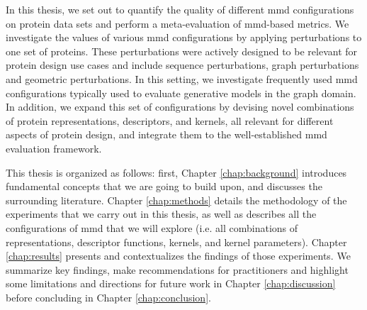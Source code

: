 In this thesis, we set out to quantify the quality of different \gls{mmd}
configurations on protein data sets and perform a meta-evaluation of
\gls{mmd}-based metrics. We investigate the values of various
\gls{mmd} configurations by applying perturbations to one set of proteins.
These perturbations were actively designed to be relevant for protein design use
cases and include sequence perturbations, graph perturbations and geometric
perturbations. In this setting, we investigate frequently used
\gls{mmd} configurations typically used to evaluate generative models in
the graph domain. In addition, we expand this set of configurations by devising
novel combinations of protein representations, descriptors, and kernels, all
relevant for different aspects of protein design, and integrate them to the
well-established \gls{mmd} evaluation framework.
\clearpage

This thesis is organized as follows: first, Chapter \ref{chap:background}
introduces fundamental concepts that we are going to build upon, and discusses
the surrounding literature. Chapter \ref{chap:methods} details the methodology
of the experiments that we carry out in this thesis, as well as
describes all the configurations of \gls{mmd} that we will explore (i.e. all
combinations of representations, descriptor functions, kernels, and kernel
parameters). Chapter \ref{chap:results} presents and contextualizes the findings of those
experiments. We summarize key findings, make recommendations for practitioners and
highlight some limitations and directions for future work in Chapter
\ref{chap:discussion} before concluding in Chapter \ref{chap:conclusion}.





